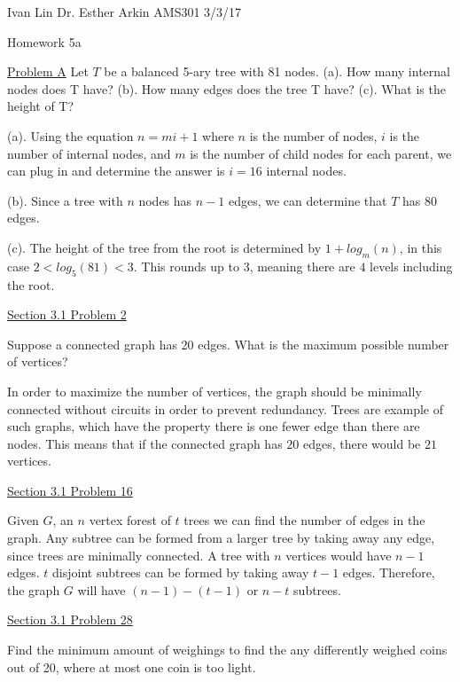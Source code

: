 \documentclass{article}
\begin{document}
Ivan Lin\newline{}
Dr. Esther Arkin\newline{}
AMS301\newline{}
3/3/17

\begin{center}
  Homework 5a
\end{center}

\underline{Problem A}
Let $T$ be a balanced 5-ary tree with 81 nodes.\newline{}
(a). How many internal nodes does T have?\newline{}
(b). How many edges does the tree T have?\newline{}
(c). What is the height of T?\newline{}

(a). Using the equation $n=mi+1$ where $n$ is the number of nodes, $i$ is the number of internal nodes, and $m$ is the number of child nodes for each parent, we can plug in and determine the answer is $i=16$ internal nodes.

(b). Since a tree with $n$ nodes has $n-1$ edges, we can determine that $T$ has 80 edges.

(c). The height of the tree from the root is determined by $1+log_m(n)$, in this case $2 < log_5(81) < 3$. This rounds up to 3, meaning there are $4$ levels including the root.

\underline{Section 3.1 Problem 2}

Suppose a connected graph has 20 edges. What is the maximum possible number
of vertices?

In order to maximize the number of vertices, the graph should be minimally connected without circuits in order to prevent redundancy. Trees are example of such graphs, which have the property there is one fewer edge than there are nodes. This means that if the connected graph has $20$ edges, there would be $21$ vertices.

\underline{Section 3.1 Problem 16}

Given $G$, an $n$ vertex forest of $t$ trees we can find the number of edges in the graph. Any subtree can be formed from a larger tree by taking away any edge, since trees are minimally connected. A tree with $n$ vertices would have $n-1$ edges. $t$ disjoint subtrees can be formed by taking away $t-1$ edges. Therefore, the graph $G$ will have $(n-1)-(t-1)$ or $n-t$ subtrees.

\underline{Section 3.1 Problem 28}

Find the minimum amount of weighings to find the any differently weighed coins out of 20, where at most one coin is too light.
\end{document}
